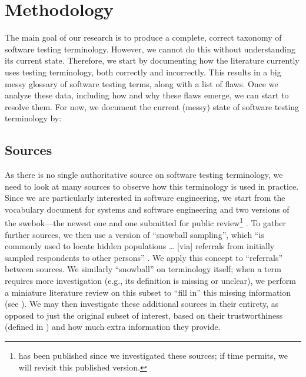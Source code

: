 \section{Methodology}
\label{methodology}

The main goal of our research is to produce a complete, correct taxonomy of
software testing terminology. However, we cannot do this without understanding
its current state. Therefore, we start by documenting how the literature
currently uses testing terminology, both correctly and incorrectly. This
results in a big messy glossary of software testing terms, along with a list of
flaws. Once we analyze these data, including how and why these flaws emerge, we
can start to resolve them. For now, we document the current (messy) state of
software testing terminology by:



\subsection{Sources}\label{sources}
As there is no single authoritative source on software testing terminology,
we need to look at many sources to observe how this terminology is used in
practice. Since we are particularly interested in software engineering, we
start from the vocabulary document for systems and software engineering%
\citep{IEEE2017} and two versions of the \acf{swebok}---the newest
one \citep{SWEBOK2014} and one submitted for public review\footnote{
     \citep{SWEBOK2024} has been published since we investigated
    these sources; if time permits, we will revisit this published version.
} \citep{SWEBOK2024}. To gather further sources, we then use a version of
``snowball sampling'',
which ``is commonly used to locate hidden populations \dots{} [via] referrals
from initially sampled respondents to other persons'' \citep{Johnson2014}. We
apply this concept to ``referrals'' between sources. \addTextEx{} We similarly
``snowball'' on terminology itself; when a term requires more investigation
(e.g., its definition is missing or unclear), we perform a
miniature literature review on this subset to ``fill in'' this missing
information (see ). We may then investigate these additional
sources in their entirety, as opposed to just the original subset of interest,
based on their trustworthiness (defined in ) and how much extra
information they provide.

